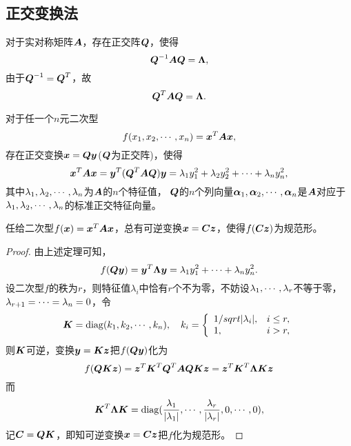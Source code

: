 \subsection{正交变换法}

\begin{frame}
  
    \begin{jielun}
      对于实对称矩阵$\A$，存在正交阵$\QQ$，使得
      $$
      \QQ^{-1}\A\QQ=\Lambdabd,
      $$
      由于$\QQ^{-1}=\QQ^T$，故
      $$
      \QQ^{T}\A\QQ=\Lambdabd.
      $$
    \end{jielun}
  
\end{frame}

\begin{frame}
  
    \begin{dingli}[主轴定理]
      对于任一个$n$元二次型
      $$
      f(x_1,x_2,\cd,x_n)=\xx^T\A\xx,
      $$
      存在正交变换$\xx=\QQ\yy$($\QQ$为正交阵)，使得
      $$
      \xx^T\A\xx=\yy^T(\QQ^T\A\QQ)\yy=\lambda_1y_1^2+\lambda_2y_2^2+\cd+\lambda_ny_n^2,
      $$
      其中$\lambda_1,\lambda_2,\cd,\lambda_n$为$\A$的$n$个特征值，
      $\QQ$的$n$个列向量$\alphabd_1,\alphabd_2,\cd,\alphabd_n$是$\A$对应于$\lambda_1,\lambda_2,\cd,\lambda_n$的标准正交特征向量。
    \end{dingli}
\end{frame}



\begin{frame}
\begin{tuilun}
  任给二次型$f(\xx)=\xx^T\A\xx$，总有可逆变换$\xx=\C\zz$，使得$f(\C\zz)$为规范形。
\end{tuilun}  \pause

\begin{proof}
  由上述定理可知，
  $$
  f(\QQ\yy)=\yy^T\Lambdabd\yy=\lambda_1y_1^2+\cd+\lambda_ny_n^2.
  $$
  设二次型$f$的秩为$r$，则特征值$\lambda_i$中恰有$r$个不为零，不妨设$\lambda_1,\cd,\lambda_r$不等于零，$\lambda_{r+1}=\cd=\lambda_n=0$，令
  $$
  \K=\diag(k_1,k_2,\cd,k_n), \quad k_i=\left\{
    \begin{array}{ll}
      1/sqrt{|\lambda_i|}, & i\le r,\\
      1, & i>r,
    \end{array}
  \right.
  $$
  则$\K$可逆，变换$\yy=\K\zz$把$f(\QQ\yy)$化为
  $$
  f(\QQ\K\zz)=\zz^T\K^T\QQ^T\A\QQ\K\zz=\zz^T\K^T\Lambdabd\K\zz
  $$
  而
  $$
  \K^T\Lambdabd\K=\diag(\frac{\lambda_1}{|\lambda_1|},\cd,\frac{\lambda_r}{|\lambda_r|},0,\cd,0),
  $$
  记$\C=\QQ\K$，即知可逆变换$\xx=\C\zz$把$f$化为规范形。
\end{proof}
\end{frame}



